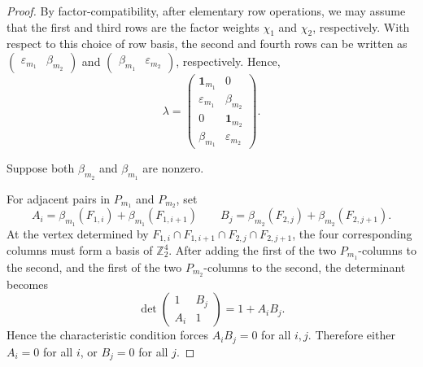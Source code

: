 \documentclass[10pt,a4paper]{amsart}
\newcommand{\Z}{\mathbb Z}
\newcommand{\one}{\mathbf 1}
\begin{document}
\begin{proof}
    By factor-compatibility, after elementary row operations, we may assume that the first and third rows are the factor weights $\chi_1$ and $\chi_2$, respectively. 
    With respect to this choice of row basis, the second and fourth rows can be written as $\begin{pmatrix} \varepsilon_{m_1} & \beta_{m_2}\end{pmatrix}$ and $\begin{pmatrix}  \beta_{m_1} &\varepsilon_{m_2} \end{pmatrix}$, respectively.
    Hence,
    $$
        \lambda=
        \begin{pmatrix}
            \one_{m_1} & 0\\
            \varepsilon_{m_1} & \beta_{m_2}\\
            0 & \one_{m_2}\\
            \beta_{m_1} & \varepsilon_{m_2}
        \end{pmatrix}.
    $$
    
    Suppose both $\beta_{m_2}$ and $\beta_{m_1}$ are nonzero. 
    
    For adjacent pairs in $P_{m_1}$ and $P_{m_2}$, set
    $$
        A_i=\beta_{m_1}(F_{1,i})+\beta_{m_1}(F_{1,i+1}) \qquad B_j=\beta_{m_2}(F_{2,j})+\beta_{m_2}(F_{2,j+1}).
    $$
    At the vertex determined by $F_{1,i}\cap F_{1,i+1}\cap F_{2,j}\cap F_{2,j+1}$, the four corresponding columns must form a basis of $\Z_2^4$. 
    After adding the first of the two $P_{m_1}$-columns to the second, and the first of the two $P_{m_2}$-columns to the second, the determinant becomes
    $$
        \det
        \begin{pmatrix}
            1 & B_j\\
            A_i & 1
        \end{pmatrix}
        = 1+A_iB_j.
    $$
    Hence the characteristic condition forces $A_iB_j=0$ for all $i,j$.
    Therefore either $A_i=0$ for all $i$, or $B_j=0$ for all $j$.
\end{proof}
\end{document}
